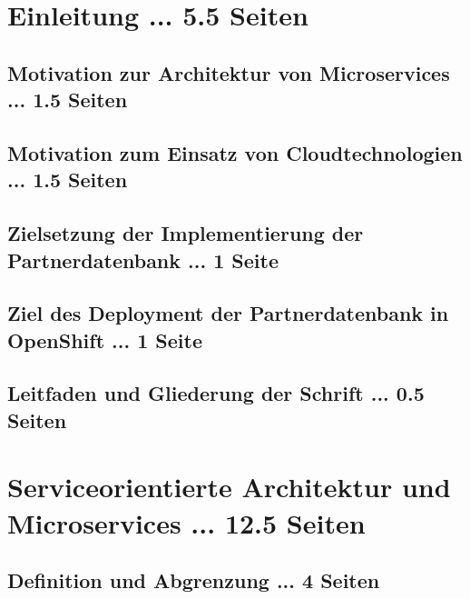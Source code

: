 \documentclass[master,german]{hgbthesis}
\begin{document}

\frontmatter							%


\tableofcontents

%

\mainmatter          			%

\chapter{Einleitung ... 5.5 Seiten}
\section{Motivation zur Architektur von Microservices ... 1.5 Seiten}
\section{Motivation zum Einsatz von Cloudtechnologien ... 1.5 Seiten}
\section{Zielsetzung der Implementierung der Partnerdatenbank ... 1 Seite}
\section{Ziel des Deployment der Partnerdatenbank in OpenShift ... 1 Seite}
\section{Leitfaden und Gliederung der Schrift ... 0.5 Seiten}

\chapter{Serviceorientierte Architektur und Microservices ... 12.5 Seiten}
\section{Definition und Abgrenzung ... 4 Seiten}
\end{document}
